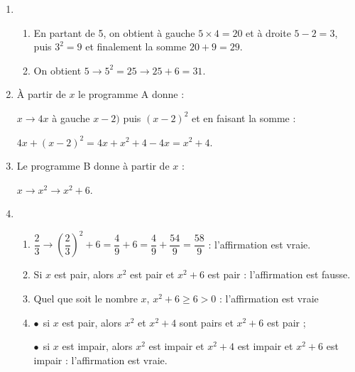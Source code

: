 \begin{enumerate}
\item 
	\begin{enumerate}
		\item %
		En partant de 5, on obtient à gauche $5 \times 4 = 20$ et à droite $5 - 2 = 3$, puis $3^2 = 9$ et finalement la somme $20 + 9 = 29$.
		\item %
		On obtient $5 \to 5^2 = 25 \to 25 + 6 = 31$.
	\end{enumerate}
\item %
À partir de $x$ le programme A donne  :

$x \to 4x$ à gauche $x - 2)$ puis $(x - 2)^2$ et en faisant la somme :

$4x + (x - 2)^2 = 4x + x^2 + 4 - 4x = x^2 + 4$.
\item %
Le programme B donne à partir de $x$ :

$x \to x^2 \to x^2 + 6$. 
\item %
	\begin{enumerate}
		\item %
$\dfrac{2}{3} \to \left(\dfrac{2}{3}\right)^2 + 6 = \dfrac{4}{9} + 6 = \dfrac{4}{9} + \dfrac{54}{9} = \dfrac{58}{9}$ : l'affirmation est vraie.		
		\item %
		Si $x$ est pair, alors $x^2$ est pair et $x^2 + 6$ est pair : l'affirmation est fausse.
		\item %
	Quel que soit le nombre $x$, \: $x^2 + 6 \geqslant 6 > 0$ : l'affirmation est vraie
		\item %
$\bullet~~$si $x$ est pair, alors $x^2$ et $x^2 + 4$ sont pairs et $x^2 + 6$ est pair ;

$\bullet~~$si $x$ est impair, alors $x^2$ est impair et $x^2 + 4$ est impair et $x^2 + 6$ est impair : l'affirmation est vraie.  
	\end{enumerate}
\end{enumerate}

\bigskip

